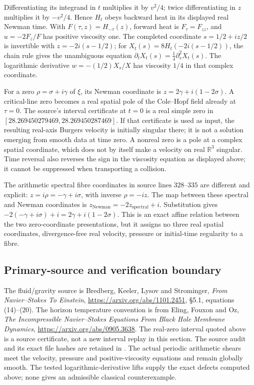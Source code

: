 Differentiating its integrand in \(t\) multiplies it by \(v^2/4\); twice differentiating in \(z\) multiplies it by \(-v^2/4\). Hence \(H_t\) obeys backward heat in its displayed real Newman time. With \(F(\tau,z)=H_{-\tau}(z)\), forward heat is \(F_{\tau}=F_{zz}\), and \(u=-2 F_z/F\) has positive viscosity one. The completed coordinate \(s=1/2+iz/2\) is invertible with \(z=-2i(s-1/2)\); for \(X_t(s)=8H_t(-2i(s-1/2))\), the chain rule gives the unambiguous equation \(\partial_t X_t(s)=\tfrac14\partial_s^2X_t(s)\). The logarithmic derivative \(w=-(1/2)X_s/X\) has viscosity \(1/4\) in that complex coordinate.

For a zero \(\rho=\sigma+i \gamma\) of \(\xi\), its Newman coordinate is \(z=2 \gamma+i(1-2 \sigma)\). A critical-line zero becomes a real spatial pole of the Cole--Hopf field already at \(\tau=0\). The source's interval certificate at \(t=0\) is a real simple zero in \([28.269450279469,28.269450287469]\). If that certificate is used as input, the resulting real-axis Burgers velocity is initially singular there; it is not a solution emerging from smooth data at time zero. A nonreal zero is a pole at a complex spatial coordinate, which does not by itself make a velocity on real \(\mathbb R^3\) singular. Time reversal also reverses the sign in the viscosity equation as displayed above; it cannot be suppressed when transporting a collision.

The arithmetic spectral fibre coordinates in \(\text{source lines }328\text{--}335\) are different and explicit: \(z=i \rho=-\gamma+i \sigma\), with inverse \(\rho=-iz\). The map between these spectral and Newman coordinates is \(z_{\mathrm{Newman}}=-2z_{\mathrm{spectral}}+i\). Substitution gives \(-2(-\gamma+i \sigma)+i=2 \gamma+i(1-2 \sigma)\). This is an exact affine relation between the two zero-coordinate presentations, but it assigns no three real spatial coordinates, divergence-free real velocity, pressure or initial-time regularity to a fibre.

\subsection{Primary-source and verification boundary}\label{primary-source-and-verification-boundary}

The fluid/gravity source is Bredberg, Keeler, Lysov and Strominger,
\emph{From Navier--Stokes To Einstein}, \url{https://arxiv.org/abs/1101.2451},
\S5.1, equations (14)--(20). The horizon temperature convention is from
Eling, Fouxon and Oz, \emph{The Incompressible Navier--Stokes Equations From
Black Hole Membrane Dynamics}, \url{https://arxiv.org/abs/0905.3638}.
The real-zero interval quoted above is a source certificate, not a new
interval replay in this section. The source audit and its exact file
hashes are retained in .
The actual periodic arithmetic shears meet the velocity, pressure and
positive-viscosity equations and remain globally smooth. The tested
logarithmic-derivative lifts supply the exact defects computed above;
none gives an admissible classical counterexample.
